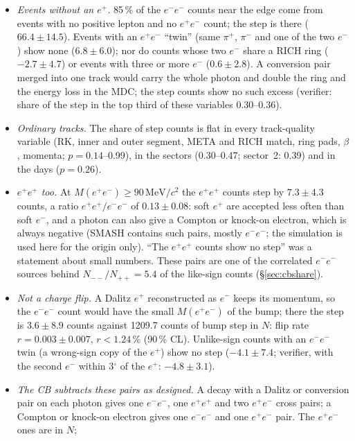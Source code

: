 \documentclass[11pt,a4paper]{article}
\newcommand{\Mfour}{\ensuremath{M(\pi^{+}\pi^{-}e^{+}e^{-})}\xspace}
\newcommand{\Mee}{\ensuremath{M(e^{+}e^{-})}\xspace}
\newcommand{\Mpipi}{\ensuremath{M(\pi^{+}\pi^{-})}\xspace}
\newcommand{\GeVcc}{\ensuremath{\mathrm{GeV}/c^{2}}\xspace}
\newcommand{\MeVcc}{\ensuremath{\mathrm{MeV}/c^{2}}\xspace}
\begin{document}
\begin{itemize}
      (\Mpipi 0.42--0.46\,\GeVcc: $-2.0\pm3.1$). This is why \Mfour per slice shows no like-sign step ($0.5\pm25.6$): at large \Mee the true edge
      lies far below the edge at $\Mee\to0$.
\item \emph{Events without an $e^+$.} 85\,\% of the $e^-e^-$ counts near the edge come from events with no positive lepton and no $e^+e^-$ count; the
      step is there ($66.4\pm14.5$). Events with an $e^+e^-$ ``twin'' (same $\pi^+$, $\pi^-$ and one of the two $e^-$) show none ($6.8\pm6.0$);
      nor do counts whose two $e^-$ share a RICH ring ($-2.7\pm4.7$) or events with three or more $e^-$ ($0.6\pm2.8$). A conversion pair merged
      into one track would carry the whole photon and double the ring and the energy loss in the MDC; the step counts show no such excess
      (verifier: share of the step in the top third of these variables 0.30--0.36).
\item \emph{Ordinary tracks.} The share of step counts is flat in every track-quality variable (RK, inner and outer segment, META and RICH match,
      ring pads, $\beta$, momenta; $p=0.14$--0.99), in the sectors (0.30--0.47; sector~2: 0.39) and in the days ($p=0.26$).
\item \emph{$e^+e^+$ too.} At \Mee$\ge90$\,\MeVcc the $e^+e^+$ counts step by $7.3\pm4.3$ counts, a ratio $e^+e^+/e^-e^-$ of $0.13\pm0.08$: soft $e^+$
      are accepted less often than soft $e^-$, and a photon can also give a Compton or knock-on electron, which is always negative (SMASH
      contains such pairs, mostly $e^-e^-$; the simulation is used here for the origin only). ``The $e^+e^+$ counts show no step'' was a statement
      about small numbers. These pairs are one of the correlated $e^-e^-$ sources behind $N_{--}/N_{++}=5.4$ of the like-sign counts
      (\S\ref{sec:cbshare}).
\item \emph{Not a charge flip.} A Dalitz $e^+$ reconstructed as $e^-$ keeps its momentum, so the $e^-e^-$ count would have the small \Mee of the
      bump; there the step is $3.6\pm8.9$ counts against 1209.7 counts of bump step in $N$: flip rate $r=0.003\pm0.007$, $r<1.24$\,\% (90\,\% CL).
      Unlike-sign counts with an $e^-e^-$ twin (a wrong-sign copy of the $e^+$) show no step ($-4.1\pm7.4$; verifier, with the second $e^-$
      within 3$^\circ$ of the $e^+$: $-4.8\pm3.1$).
\item \emph{The CB subtracts these pairs as designed.} A decay with a Dalitz or conversion pair on each photon gives one $e^-e^-$, one
      $e^+e^+$ and two $e^+e^-$ cross pairs; a Compton or knock-on electron gives one $e^-e^-$ and one $e^+e^-$ pair. The $e^+e^-$ ones are in $N$;

\end{itemize}
\end{document}
